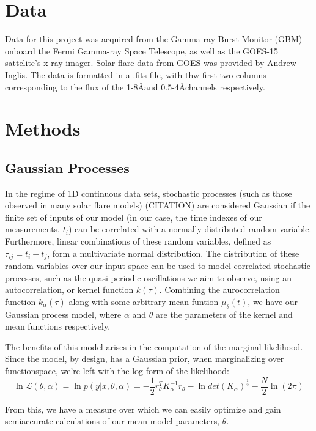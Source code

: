 \documentclass{aastex61}
\begin{document}
\section{Data} \label{sec:data}
Data for this project was acquired from the Gamma-ray Burst Monitor (GBM) onboard the Fermi Gamma-ray Space Telescope, as well as the GOES-15 sattelite's x-ray imager.
Solar flare data from GOES  was provided by Andrew Inglis.
The data is formatted in a .fits file, with thw first two columns corresponding to the flux of the 1-8\AA and 0.5-4\AA channels respectively.



\section{Methods} \label{sec:methods}
\subsection{Gaussian Processes}
In the regime of 1D continuous data sets, stochastic processes (such as those observed in many solar flare models) (CITATION) are considered Gaussian if the finite set of inputs of our model (in our case, the time indexes of our measurements, $t_i$) can be correlated with a normally distributed random variable.
Furthermore, linear combinations of these random variables, defined as $\tau_{ij}=t_i-t_j$, form a multivariate normal distribution.
The distribution of these random variables over our input space can be used to model correlated stochastic processes, such as the quasi-periodic oscillations we aim to observe, using an autocorrelation, or kernel function $k(\tau)$.
Combining the aurocorrelation function $k_\alpha (\tau)$ along with some arbitrary mean funtion $\mu_\theta (t)$, we have our Gaussian process model, where $\alpha$ and $\theta$ are the parameters of the kernel and mean functions respectively.

The benefits of this model arises in the computation of the marginal likelihood. Since the model, by design, has a Gaussian prior, when marginalizing over functionspace, we're left with the log form of the likelihood:
\begin{equation}
	\ln \mathcal{L}(\theta, \alpha) = \ln p(y|x, \theta, \alpha) = -\frac{1}{2}r_\theta^T K_\alpha^{-1}r_\theta - \ln det(K_\alpha)^{\frac{1}{2}} - \frac{N}{2}\ln(2 \pi)
	\label{loglike}
\end{equation}

From this, we have a measure over which we can easily optimize and gain semiaccurate calculations of our mean model parameters, $\theta$.
\end{document}
